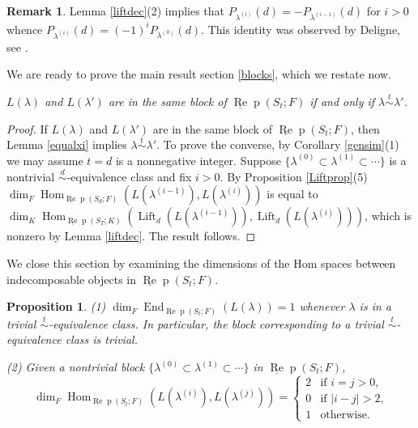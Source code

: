 \documentclass{amsart}
\newtheorem{proposition}[theorem]{Proposition}
\theoremstyle{definition}
\newtheorem{remark}[theorem]{Remark}
\newcommand{\Hom}{\operatorname{Hom}}
\def\uRep{\underline{\operatorname{Re}}\!\operatorname{p}}
\newcommand{\Lift}{\operatorname{Lift}}
\renewcommand{\1}{_{(1)}}
\renewcommand{\2}{_{(2)}}
\newcommand{\3}{_{(3)}}
\newcommand{\4}{_{(4)}}
\begin{document}
\begin{remark} Lemma \ref{liftdec}(2) implies that $P_{\lambda^{(i)}}(d)=-P_{\lambda^ 
{(i-1)}}(d)$
for $i>0$ whence $P_{\lambda^{(i)}}(d)=(-1)^i P_{\lambda^{(0)}}(d)$. This  
identity was
observed by Deligne, see \cite[\S 7.5]{Del07}.
\end{remark}

We are ready to prove the main result section \ref{blocks}, which we restate now.

\medskip

 \emph{$L(\lambda)$ and $L(\lambda')$ are in the same block of $\uRep(S_t; F)$ if and only if $\lambda\stackrel{t}{\sim}\lambda'$.}

\begin{proof}   If $L(\lambda)$ and $L(\lambda')$ are in the same block of $\uRep(S_t; F)$, then Lemma \ref{equalxi} implies $\lambda\stackrel{t}{\sim}\lambda'$.
To prove the converse, by Corollary \ref{gensim}(1) we may assume $t=d$ is a nonnegative integer.  Suppose $\{\lambda^{(0)}\subset \lambda^{(1)}\subset\cdots\}$ is a nontrivial $\stackrel{d}{\sim}$-equivalence class and fix $i> 0$. By Proposition \ref{Liftprop}(5) $\dim_F\Hom_{\uRep(S_d; F)}(L(\lambda^{(i-1)}), L(\lambda^{(i)}))$ is equal to $\dim_K\Hom_{\uRep(S_T; K)}(\Lift_d(L(\lambda^{(i-1)})), \Lift_d(L(\lambda^{(i)})))$, which is nonzero by Lemma \ref{liftdec}.  The result follows.
\end{proof}

We close this section by examining the dimensions of the Hom spaces between indecomposable objects in $\uRep(S_t; F)$.

\begin{proposition}\label{dimstuff} (1) $\dim_F\operatorname{End}_{\uRep(S_t; F)}(L(\lambda))=1$ whenever $\lambda$ is in a trivial $\stackrel{t}{\sim}$-equivalence class.  In particular, the block corresponding to a trivial $\stackrel{t}{\sim}$-equivalence class is trivial.

(2) Given a nontrivial block 
$\{\lambda^{(0)}\subset\lambda^{(1)}\subset\cdots\}$ in $\uRep(S_t; F)$, $$\dim_F\Hom_{\uRep(S_t; F)}(L(\lambda^{(i)}), L(\lambda^{(j)}))=\left\{\begin{array}{ll}
2& \text{if $i=j>0$,}\\
0& \text{if $|i-j|>2$,}\\
1& \text{otherwise.}
\end{array}\right.$$
\end{proposition}
\end{document}
